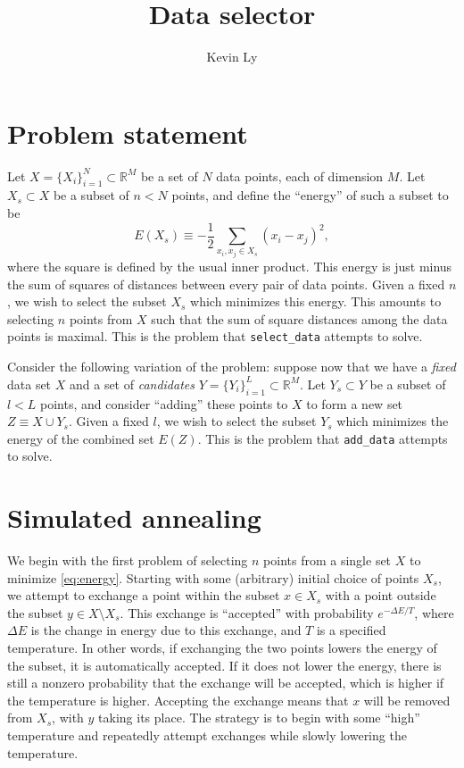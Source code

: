 \documentclass{article}
\title{Data selector}
\author{Kevin Ly}
\begin{document}
\maketitle

\section{Problem statement}

Let $X = \{ X_i \}_{i = 1}^{N} \subset \mathbb{R}^M$ be a set of $N$ data points, each of dimension $M$.
Let $X_s \subset X$ be a subset of $n < N$ points, and define the ``energy'' of such a subset to be
\begin{equation}
    \label{eq:energy}
    E(X_s) \equiv -\frac{1}{2}\sum_{x_i, x_j \in X_s} (x_i - x_j)^2,
\end{equation}
where the square is defined by the usual inner product.
This energy is just minus the sum of squares of distances between every pair of data points.
Given a fixed $n$, we wish to select the subset $X_s$ which minimizes this energy.
This amounts to selecting $n$ points from $X$ such that the sum of square distances among the data points is maximal.
This is the problem that \texttt{select\_data} attempts to solve.

Consider the following variation of the problem: suppose now that we have a \emph{fixed} data set $X$ and a set of \emph{candidates} $Y = \{ Y_i \}_{i = 1}^{L} \subset \mathbb{R}^M$.
Let $Y_s \subset Y$ be a subset of $l < L$ points, and consider ``adding'' these points to $X$ to form a new set $Z \equiv X \cup Y_s$.
Given a fixed $l$, we wish to select the subset $Y_s$ which minimizes the energy of the combined set $E(Z)$.
This is the problem that \texttt{add\_data} attempts to solve.

\section{Simulated annealing}

We begin with the first problem of selecting $n$ points from a single set $X$ to minimize \eqref{eq:energy}.
Starting with some (arbitrary) initial choice of points $X_{s}$, we attempt to exchange a point within the subset $x \in X_{s}$ with a point outside the subset $y \in X \setminus X_s$.
This exchange is ``accepted'' with probability $e^{-\Delta E / T}$, where $\Delta E$ is the change in energy due to this exchange, and $T$ is a specified temperature.
In other words, if exchanging the two points lowers the energy of the subset, it is automatically accepted.
If it does not lower the energy, there is still a nonzero probability that the exchange will be accepted, which is higher if the temperature is higher.
Accepting the exchange means that $x$ will be removed from $X_s$, with $y$ taking its place.
The strategy is to begin with some ``high'' temperature and repeatedly attempt exchanges while slowly lowering the temperature.
\end{document}
